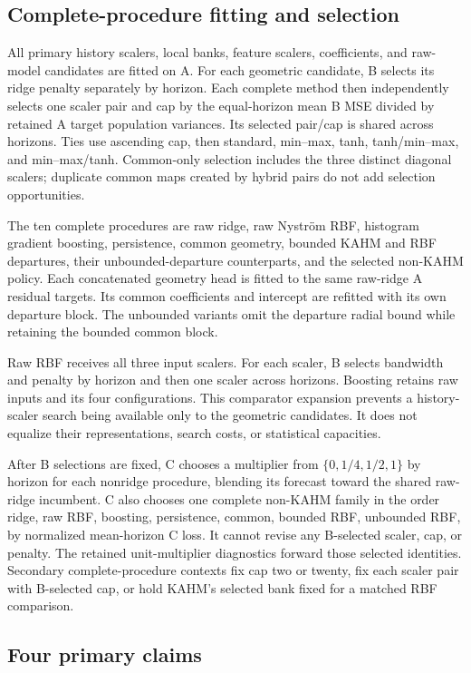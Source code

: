 \subsection{Complete-procedure fitting and selection}

All primary history scalers, local banks, feature scalers, coefficients,
and raw-model candidates are fitted on A. For each geometric candidate,
B selects its ridge penalty separately by horizon. Each complete method
then independently selects one scaler pair and cap by the equal-horizon
mean B MSE divided by retained A target population variances. Its selected
pair/cap is shared across horizons. Ties use ascending cap, then standard,
min--max, tanh, tanh/min--max, and min--max/tanh. Common-only selection
includes the three distinct diagonal scalers; duplicate common maps
created by hybrid pairs do not add selection opportunities.

The ten complete procedures are raw ridge, raw Nystr\"om RBF, histogram
gradient boosting, persistence, common geometry, bounded KAHM and RBF
departures, their unbounded-departure counterparts, and the selected
non-KAHM policy. Each concatenated geometry head is fitted to the same
raw-ridge A residual targets. Its common coefficients and intercept are
refitted with its own departure block. The unbounded variants omit the
departure radial bound while retaining the bounded common block.

Raw RBF receives all three input scalers. For each scaler, B selects
bandwidth and penalty by horizon and then one scaler across horizons.
Boosting retains raw inputs and its four configurations. This comparator
expansion prevents a history-scaler search being available only to the
geometric candidates. It does not equalize their representations, search
costs, or statistical capacities.

After B selections are fixed, C chooses a multiplier from
$\{0,1/4,1/2,1\}$ by horizon for each nonridge procedure, blending its
forecast toward the shared raw-ridge incumbent. C also chooses one complete
non-KAHM family in the order ridge, raw RBF, boosting, persistence, common,
bounded RBF, unbounded RBF, by normalized mean-horizon C loss. It cannot
revise any B-selected scaler, cap, or penalty. The retained unit-multiplier
diagnostics forward those selected identities. Secondary complete-procedure
contexts fix cap two or twenty, fix each scaler pair with B-selected cap,
or hold KAHM's selected bank fixed for a matched RBF comparison.

\subsection{Four primary claims}

